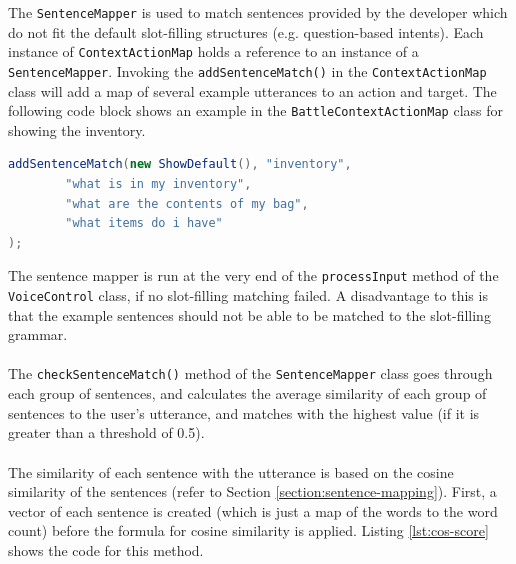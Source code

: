 \documentclass[11pt]{article}
\begin{document}
The \texttt{SentenceMapper} is used to match sentences provided by the developer which do not fit the default slot-filling structures (e.g. question-based intents). Each instance of \texttt{ContextActionMap} holds a reference to an instance of a \texttt{SentenceMapper}. Invoking the \texttt{addSentenceMatch()} in the \texttt{ContextActionMap} class will add a map of several example utterances to an action and target. The following code block shows an example in the \texttt{BattleContextActionMap} class for showing the inventory.

\begin{lstlisting}[language=Java]
addSentenceMatch(new ShowDefault(), "inventory",
        "what is in my inventory",
        "what are the contents of my bag",
        "what items do i have"
);
\end{lstlisting}

The sentence mapper is run at the very end of the \texttt{processInput} method of the \texttt{VoiceControl} class, if no slot-filling matching failed. A disadvantage to this is that the example sentences should not be able to be matched to the slot-filling grammar.
\\
\\
The \texttt{checkSentenceMatch()} method of the \texttt{SentenceMapper} class goes through each group of sentences, and calculates the average similarity of each group of sentences to the user's utterance, and matches with the highest value (if it is greater than a threshold of 0.5).
\\
\\
The similarity of each sentence with the utterance is based on the cosine similarity of the sentences (refer to Section \ref{section:sentence-mapping}). First, a vector of each sentence is created (which is just a map of the words to the word count) before the formula for cosine similarity is applied. Listing \ref{lst:cos-score} shows the code for this method.
\end{document}
